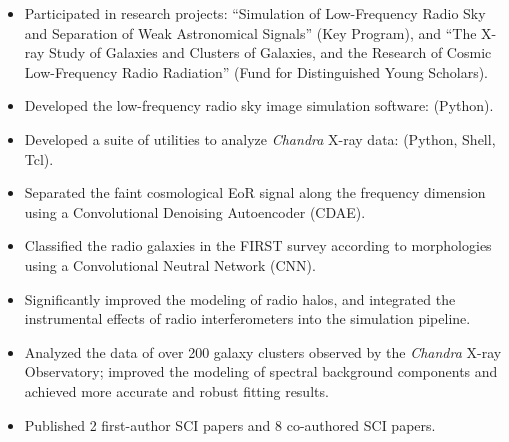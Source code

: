 \documentclass{resume}
\begin{document}
\begin{itemize}
  \item Participated in research projects:
    \enquote{Simulation of Low-Frequency Radio Sky and Separation of Weak
     Astronomical Signals} (Key Program), and
    \enquote{The X-ray Study of Galaxies and Clusters of Galaxies,
      and the Research of Cosmic Low-Frequency Radio Radiation}
    (Fund for Distinguished Young Scholars).
  \item Developed the low-frequency radio sky image simulation software:
    (Python).
  \item Developed a suite of utilities to analyze \textit{Chandra} X-ray data:
    (Python, Shell, Tcl).
  \item Separated the faint cosmological EoR signal along the frequency
    dimension using a Convolutional Denoising Autoencoder (CDAE).
  \item Classified the radio galaxies in the FIRST survey according to
    morphologies using a Convolutional Neutral Network (CNN).
  \item Significantly improved the modeling of radio halos,
    and integrated the instrumental effects of radio interferometers
    into the simulation pipeline.
  \item Analyzed the data of over 200 galaxy clusters observed by the
    \textit{Chandra} X-ray Observatory; improved the modeling of spectral
    background components and achieved more accurate and robust fitting
    results.
  \item Published 2 first-author SCI papers and 8 co-authored SCI papers.
\end{itemize}
\end{document}
